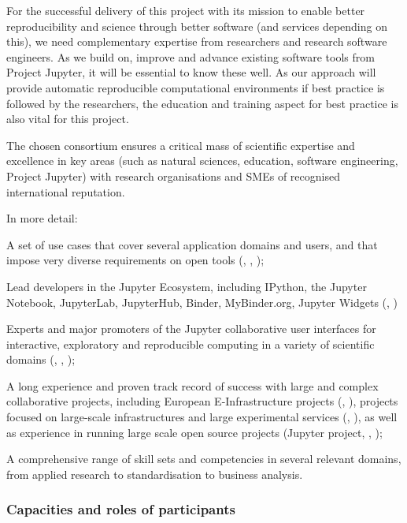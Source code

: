 For the successful delivery of this project with its mission to enable better
reproducibility and science through better software (and services depending on
this), we need complementary expertise from researchers and research software
engineers. As we build on, improve and advance existing software tools from
Project Jupyter, it will be essential to know these well. As our approach will
provide automatic reproducible computational environments if best practice is
followed by the researchers, the education and training aspect for best practice
is also vital for this project.

The chosen consortium ensures a critical mass of scientific expertise and
excellence in key areas (such as natural sciences, education, software
engineering, Project Jupyter) with research organisations and SMEs of recognised
international reputation.

In more detail:
\begin{compactitem}
\item A set of use cases that cover several application domains and users, and that impose very diverse
requirements on open tools (, , );
\item Lead developers in the Jupyter Ecosystem, including IPython, the Jupyter Notebook, JupyterLab,
JupyterHub, Binder, MyBinder.org, Jupyter Widgets (, )
\item Experts and major promoters of the Jupyter collaborative user interfaces
  for interactive, exploratory and reproducible computing in a variety of scientific domains (, , );
\item A long experience and proven track record of success with large and complex collaborative projects,
including European E-Infrastructure projects (, ),
projects focused on large-scale infrastructures and large experimental services (, ),
as well as experience in running large scale open source projects (Jupyter project, , );
\item A comprehensive range of skill sets and competencies in several relevant domains,
from applied research to standardisation to business analysis.
\end{compactitem}

\subsubsection{Capacities and roles of participants}

